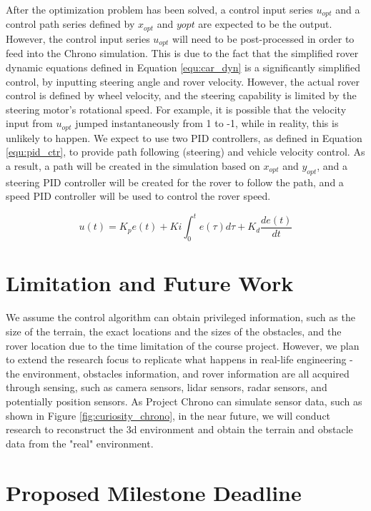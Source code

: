 \documentclass{article}
\begin{document}
After the optimization problem has been solved, a control input series \(u_{opt}\) and a control path series defined by \(x_{opt}\) and \(y{opt}\) are expected to be the output. However, the control input series \(u_{opt}\) will need to be post-processed in order to feed into the Chrono simulation. This is due to the fact that the simplified rover dynamic equations defined in Equation \ref{equ:car_dyn} is a significantly simplified control, by inputting steering angle and rover velocity. However, the actual rover control is defined by wheel velocity, and the steering capability is limited by the steering motor's rotational speed. For example, it is possible that the velocity input from \(u_{opt}\) jumped instantaneously from 1 to -1, while in reality, this is unlikely to happen. We expect to use two PID controllers, as defined in Equation \ref{equ:pid_ctr}, to provide path following (steering) and vehicle velocity control. As a result, a path will be created in the simulation based on \(x_{opt}\) and \(y_{opt}\), and a steering PID controller will be created for the rover to follow the path, and a speed PID controller will be used to control the rover speed.

\begin{equation}
\label{equ:pid_ctr}
    u(t) = K_{p}e(t) + K{i}\int_{0}^{t}e(\tau)d\tau+K_{d}\frac{de(t)}{dt}
\end{equation}


\section{Limitation and Future Work}

We assume the control algorithm can obtain privileged information, such as the size of the terrain, the exact locations and the sizes of the obstacles, and the rover location due to the time limitation of the course project. However, we plan to extend the research focus to replicate what happens in real-life engineering - the environment, obstacles information, and rover information are all acquired through sensing, such as camera sensors, lidar sensors, radar sensors, and potentially position sensors. As Project Chrono can simulate sensor data, such as shown in Figure \ref{fig:curiosity_chrono}, in the near future, we will conduct research to reconstruct the 3d environment and obtain the terrain and obstacle data from the "real" environment. 
 
\section{Proposed Milestone Deadline}
\end{document}
